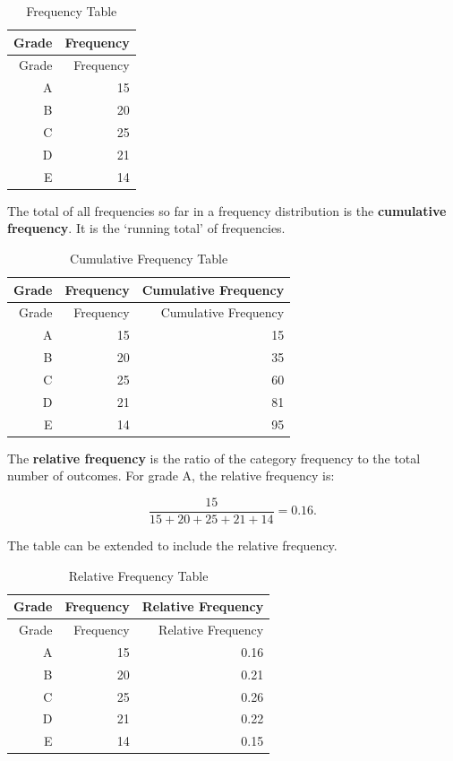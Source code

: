 \documentclass[
]{book}
\begin{document}
\begin{longtable}[]{@{}rr@{}}
\caption{\label{tab:table2}Frequency Table}\tabularnewline
\toprule
Grade & Frequency \\
\midrule
\endfirsthead
\toprule
Grade & Frequency \\
\midrule
\endhead
A & 15 \\
B & 20 \\
C & 25 \\
D & 21 \\
E & 14 \\
\bottomrule
\end{longtable}

The total of all frequencies so far in a frequency distribution is the \textbf{cumulative frequency}. It is the `running total' of frequencies.

\begin{longtable}[]{@{}rrr@{}}
\caption{\label{tab:table3}Cumulative Frequency Table}\tabularnewline
\toprule
Grade & Frequency & Cumulative Frequency \\
\midrule
\endfirsthead
\toprule
Grade & Frequency & Cumulative Frequency \\
\midrule
\endhead
A & 15 & 15 \\
B & 20 & 35 \\
C & 25 & 60 \\
D & 21 & 81 \\
E & 14 & 95 \\
\bottomrule
\end{longtable}

The \textbf{relative frequency} is the ratio of the category frequency to the total number of outcomes. For grade A, the relative frequency is:

\[ \frac{15}{15+20+25+21+14}=0.16. \]

The table can be extended to include the relative frequency.

\begin{longtable}[]{@{}rrr@{}}
\caption{\label{tab:table4}Relative Frequency Table}\tabularnewline
\toprule
Grade & Frequency & Relative Frequency \\
\midrule
\endfirsthead
\toprule
Grade & Frequency & Relative Frequency \\
\midrule
\endhead
A & 15 & 0.16 \\
B & 20 & 0.21 \\
C & 25 & 0.26 \\
D & 21 & 0.22 \\
E & 14 & 0.15 \\
\bottomrule
\end{longtable}
\end{document}
